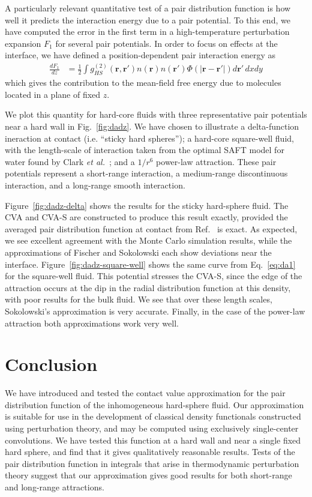 \documentclass[letterpaper,twocolumn,amsmath,amssymb,pre,aps,10pt]{revtex4-1}
\newcommand{\rr}{\textbf{r}}
\begin{document}
A particularly relevant quantitative test of a pair distribution
function is how well it predicts the interaction energy due to a pair
potential.  To this end, we have computed the error in the first term
in a high-temperature perturbation expansion $F_1$
for several pair potentials.  In order to focus on effects at the
interface, we have defined a position-dependent pair interaction
energy as
\begin{align}
  \frac{dF_1}{dz} &=
  \tfrac12 \int g^{(2)}_{HS}(\rr,\rr')n(\rr)n(\rr')\Phi(|\rr-\rr'|)
  d\rr'\, dxdy\label{eq:da1}
\end{align}
which gives the contribution to the mean-field free energy due to
molecules located in a plane of fixed $z$.

We plot this quantity for hard-core fluids with three representative
pair potentials near a hard wall in Fig.~\ref{fig:dadz}.  We have
chosen to illustrate a delta-function ineraction at contact
(i.e. ``sticky hard spheres''); a hard-core square-well fluid, with
the length-scale of interaction taken from the optimal SAFT model for
water found by Clark \emph{et al.}~\cite{clark2006developing}; and a
$1/r^6$ power-law attraction.  These pair potentials represent a
short-range interaction, a medium-range discontinuous interaction, and
a long-range smooth interaction.

Figure~\ref{fig:dadz-delta} shows the results for the sticky
hard-sphere fluid.  The CVA and CVA-S are constructed to produce this
result exactly, provided the averaged pair distribution function at
contact from Ref.~ is exact.  As expected,
we see excellent agreement with the Monte Carlo simulation results,
while the approximations of Fischer and Sokolowski each show
deviations near the interface.  Figure~\ref{fig:dadz-square-well}
shows the same curve from Eq.~\ref{eq:da1} for the square-well fluid.
This potential stresses the CVA-S, since the edge of the
attraction occurs at the dip in the radial distribution function at
this density, with poor results for the bulk fluid.  We see that over
these length scales, Sokolowski's approximation is very accurate.
Finally, in the case of the power-law attraction both approximations
work very well.

\section{Conclusion}

We have introduced and tested the contact value approximation for the pair
distribution function of the inhomogeneous hard-sphere fluid.  Our
approximation is suitable for use in the development of classical
density functionals constructed using perturbation theory, and
may be computed using exclusively single-center convolutions.  We have
tested this function at a hard wall and near a single fixed hard
sphere, and find that it gives qualitatively reasonable results.
Tests of the pair distribution function in integrals that arise in
thermodynamic perturbation theory suggest that our approximation gives
good results for both short-range and long-range attractions.
\end{document}
